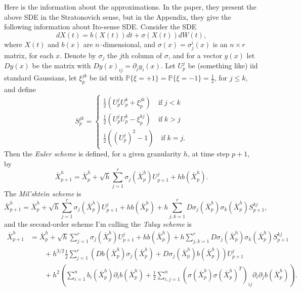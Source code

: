 \documentclass{amsart}
\renewcommand{\P}{\mathbb{P}}
\begin{document}
Here is the information about the approximations.
In the paper, they present the above SDE in the Stratonovich sense, 
but in the Appendix, they give the following information about Ito-sense SDE.
Consider the SDE
\begin{equation}
    dX(t) = b(X(t)) dt + \sigma(X(t)) dW(t),
\end{equation}
where $X(t)$ and $b(x)$ are $n$--dimensional, and $\sigma(x)=\sigma^i_j(x)$ is an $n \times r$ matrix, for each $x$.
Denote by $\sigma_j$ the $j$th column of $\sigma$, and for a vector $y(x)$ let $Dy(x)$ be the matrix with $Dy(x)_{ij} = \partial_j y_i(x)$.
Let $U^j_p$ be (something like) iid standard Gaussians,
let $\xi^{jk}_p$ be iid with $\P\{ \xi = +1 \} = \P\{ \xi = -1 \} = \frac{1}{2}$, for $j\le k$,
and define
\begin{equation}
  S^{jk}_p = \begin{cases}
        \frac12 \left( U^j_{p}U^k_{p} + \xi^{jk}_{p} \right) \quad \mbox{if}\; j<k \\
        \frac12 \left( U^j_{p}U^k_{p} - \xi^{kj}_{p} \right) \quad \mbox{if}\; k>j \\
        \frac12 \left((U^j_{p})^2 - 1 \right) \quad \mbox{if}\; k=j .
\end{cases}
\end{equation}
Then the {\em Euler scheme} is defined, for a given granularity $h$, at time step $p+1$, by
\begin{equation}
    \bar X^h_{p+1} = \bar X^h_p + \sqrt{h} \sum_{j=1}^r \sigma_j(\bar X^h_p) U^j_{p+1} + h b(\bar X^h_p) .
\end{equation}
The {\em Mil'shte\u{\i}n scheme} is
\begin{equation}
    \bar X^h_{p+1} = \bar X^h_p + \sqrt{h} \sum_{j=1}^r \sigma_j(\bar X^h_p) U^j_{p+1} + h b(\bar X^h_p) 
            + h \sum_{j,k=1}^r D\sigma_j(\bar X^h_p) \sigma_k(\bar X^h_p) S^{kj}_{p+1} ,
\end{equation}
and the second-order scheme I'm calling the {\em Talay scheme} is
\begin{equation}
 \begin{split}
    \bar X^h_{p+1} &= \bar X^h_p + \sqrt{h} \sum_{j=1}^r \sigma_j(\bar X^h_p) U^j_{p+1} + h b(\bar X^h_p) 
            + h \sum_{j,k=1}^r D\sigma_j(\bar X^h_p) \sigma_k(\bar X^h_p) S^{kj}_{p+1} \\
         &\qquad   + h^{3/2} \frac12 \sum_{j=1}^r \left( Db(\bar X^h_p) \sigma_j(\bar X^h_p) + D\sigma_j(\bar X^h_p) b(\bar X^h_p) \right) U^j_{p+1} \\
         &\qquad  + h^2 \left( \sum_{i=1}^n b_i(\bar X^h_p) \partial_i b(\bar X^h_p) 
            + \frac12 \sum_{i,j=1}^n \left( \sigma(\bar X^h_p) \sigma(\bar X^h_p)^T \right)_{ij} \partial_i \partial_j b(\bar X^h_p) \right) .
\end{split}
\end{equation}
\end{document}
